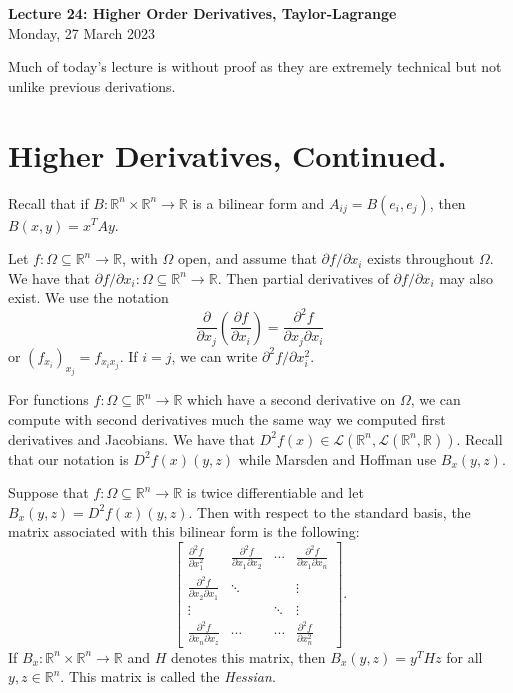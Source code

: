 \documentclass[11pt]{article}
\theoremstyle{definition}
\newcommand{\R}{\mathbb{R}}                      %
\newcommand{\mat}{\begin{bmatrix}}
\newcommand{\trix}{\end{bmatrix}}
\newcommand{\dell}{\partial}
\begin{document}
\thispagestyle{empty}

\begin{center}
{\LARGE \bf Lecture 24: Higher Order Derivatives, Taylor-Lagrange}\\
{\large Monday, 27 March 2023}\\
\end{center}

Much of today's lecture is without proof as they are extremely technical but not unlike previous derivations.

\section{Higher Derivatives, Continued.}

Recall that if $B:\R^n\times\R^n\to \R$ is a bilinear form and $A_{ij}=B(e_i,e_j)$, then $B(x,y)=x^TAy$. 

Let $f:\Omega\subseteq \R^n\to \R$, with $\Omega$ open, and assume that $\dell f/\dell x_i$ exists throughout $\Omega$. We have that $\dell f/\dell x_i:\Omega\subseteq \R^n\to \R$. Then partial derivatives of $\dell f/\dell x_i$ may also exist. We use the notation
$$
\frac{\dell}{\dell x_j}\left(\frac{\dell f}{\dell x_i}\right)=\frac{\dell^2 f}{\dell x_j\dell x_i}
$$
or $(f_{x_i})_{x_j}=f_{x_ix_j}$. If $i=j$, we can write $\dell^2 f/\dell x_i^2$.

For functions $f:\Omega\subseteq \R^n\to \R$ which have a second derivative on $\Omega$, we can compute with second derivatives much the same way we computed first derivatives and Jacobians. We have that $D^2f(x)\in \mathcal{L}(\R^n,\mathcal{L}(\R^n,\R))$. Recall that our notation is $D^2f(x)(y,z)$ while Marsden and Hoffman use $B_x(y,z)$.

\prop Suppose that $f:\Omega\subseteq \R^n\to\R$ is twice differentiable and let $B_x(y,z)=D^2 f(x)(y,z)$. Then with respect to the standard basis, the matrix associated with this bilinear form is the following:
$$
\mat 
\frac{\dell^2 f}{\dell x_1^2} & \frac{\dell^2 f}{\dell x_1\dell x_2}&\cdots& \frac{\dell^2 f}{\dell x_1\dell x_n}\\
\frac{\dell^2 f}{\dell x_2 \dell x_1}&\ddots & &\vdots\\
\vdots &&\ddots &\vdots \\
\frac{\dell ^2 f}{\dell x_n\dell x_z}&\cdots &\cdots &\frac{\dell^2 f}{\dell x_n^2}

\trix.
$$
If $B_x:\R^n\times\R^n\to \R$ and $H$ denotes this matrix, then $B_x(y,z)=y^THz$ for all $y,z\in\R^n$. This matrix is called the \textit{Hessian}.
\end{document}
